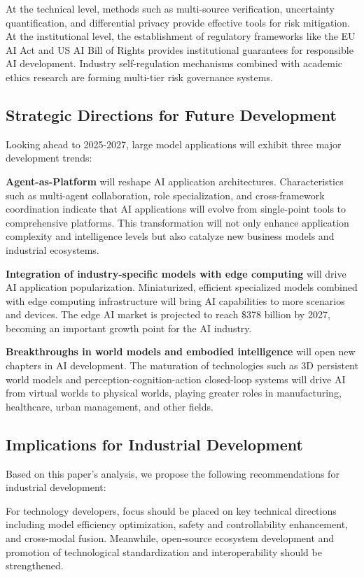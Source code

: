 \documentclass{article}
\begin{document}
At the technical level, methods such as multi-source verification, uncertainty quantification, and differential privacy provide effective tools for risk mitigation. At the institutional level, the establishment of regulatory frameworks like the EU AI Act and US AI Bill of Rights provides institutional guarantees for responsible AI development. Industry self-regulation mechanisms combined with academic ethics research are forming multi-tier risk governance systems.

\subsection{Strategic Directions for Future Development}
Looking ahead to 2025-2027, large model applications will exhibit three major development trends:

\textbf{Agent-as-Platform} will reshape AI application architectures. Characteristics such as multi-agent collaboration, role specialization, and cross-framework coordination indicate that AI applications will evolve from single-point tools to comprehensive platforms. This transformation will not only enhance application complexity and intelligence levels but also catalyze new business models and industrial ecosystems.

\textbf{Integration of industry-specific models with edge computing} will drive AI application popularization. Miniaturized, efficient specialized models combined with edge computing infrastructure will bring AI capabilities to more scenarios and devices. The edge AI market is projected to reach \$378 billion by 2027, becoming an important growth point for the AI industry.

\textbf{Breakthroughs in world models and embodied intelligence} will open new chapters in AI development. The maturation of technologies such as 3D persistent world models and perception-cognition-action closed-loop systems will drive AI from virtual worlds to physical worlds, playing greater roles in manufacturing, healthcare, urban management, and other fields.

\subsection{Implications for Industrial Development}
Based on this paper's analysis, we propose the following recommendations for industrial development:

For technology developers, focus should be placed on key technical directions including model efficiency optimization, safety and controllability enhancement, and cross-modal fusion. Meanwhile, open-source ecosystem development and promotion of technological standardization and interoperability should be strengthened.
\end{document}
